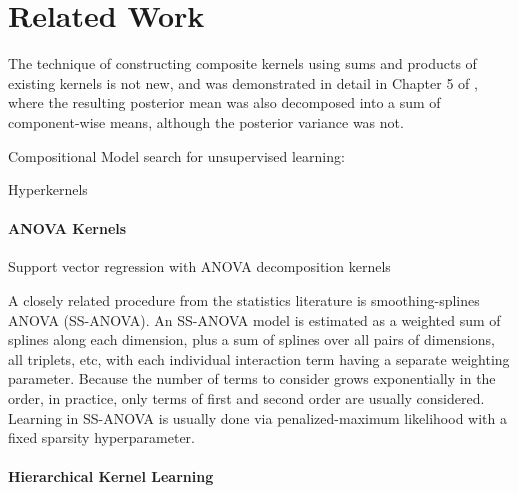 \documentclass[twoside]{article}
\begin{document}
\section{Related Work}

The technique of constructing composite kernels using sums and products of existing kernels is not new, and was demonstrated in detail in Chapter 5 of \cite{rasmussen38gaussian}, where the resulting posterior mean was also decomposed into a sum of component-wise means, although the posterior variance was not.

Compositional Model search for unsupervised learning: \cite{grosse2012exploiting}

Hyperkernels \cite{ong2002hyperkernels}

\paragraph{ANOVA Kernels}

Support vector regression with ANOVA decomposition kernels \cite{stitson1999support}

A closely related procedure from the statistics literature is smoothing-splines ANOVA (SS-ANOVA)\cite{wahba1990spline, gu2002smoothing}.
An SS-ANOVA model is estimated as a weighted sum of splines along each dimension, plus a sum of splines over all pairs of dimensions, all triplets, etc, with each individual interaction term having a separate weighting parameter.
Because the number of terms to consider grows exponentially in the order, in practice, only terms of first and second order are usually considered.
Learning in SS-ANOVA is usually done via penalized-maximum likelihood with a fixed sparsity hyperparameter.

\paragraph{Hierarchical Kernel Learning}
\end{document}
